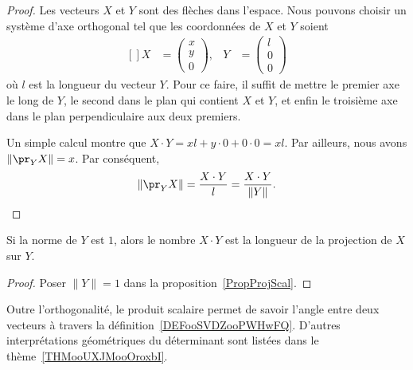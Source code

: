 \begin{proof}
	Les vecteurs $X$ et $Y$ sont des flèches dans l'espace. Nous pouvons choisir un système d'axe orthogonal tel que les coordonnées de $X$ et $Y$ soient
	\begin{equation}
		\begin{aligned}[]
			X&=\begin{pmatrix}
				x	\\
				y	\\
				0
			\end{pmatrix},
			&Y&=\begin{pmatrix}
				l	\\
				0	\\
				0
			\end{pmatrix}
		\end{aligned}
	\end{equation}
	où $l$ est la longueur du vecteur $Y$. Pour ce faire, il suffit de mettre le premier axe le long de $Y$, le second dans le plan qui contient $X$ et $Y$, et enfin le troisième axe dans le plan perpendiculaire aux deux premiers.

	Un simple calcul montre que $X\cdot Y=xl+y\cdot 0+0\cdot 0=xl$. Par ailleurs, nous avons $\| \pr_YX \|=x$. Par conséquent,
	\begin{equation}
		\| \pr_YX \|=\frac{ X\cdot Y }{ l }=\frac{ X\cdot Y }{ \| Y \| }.
	\end{equation}
\end{proof}

\begin{corollary}
	Si la norme de $Y$ est $1$, alors le nombre $X\cdot Y$ est la longueur de la projection de $X$ sur $Y$.
\end{corollary}

\begin{proof}
	Poser $\| Y \|=1$ dans la proposition~\ref{PropProjScal}.
\end{proof}

\begin{remark}
    Outre l'orthogonalité, le produit scalaire permet de savoir l'angle entre deux vecteurs à travers la définition~\ref{DEFooSVDZooPWHwFQ}. D'autres interprétations géométriques du déterminant sont listées dans le thème~\ref{THMooUXJMooOroxbI}.
\end{remark}

